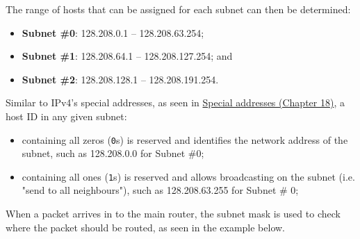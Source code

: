 \documentclass[a4paper]{systems-software}
\begin{document}
The range of hosts that can be assigned for each subnet can then be determined:
\begin{itemize}
	\item \textbf{Subnet \#0}: 128.208.0.1 -- 128.208.63.254;
	\item \textbf{Subnet \#1}: 128.208.64.1 -- 128.208.127.254; and
	\item \textbf{Subnet \#2}: 128.208.128.1 -- 128.208.191.254.
\end{itemize}

Similar to IPv4's special addresses, as seen in \hyperref[sec:special_addresses]{Special addresses (Chapter 18)}, a host ID in any given subnet:
\begin{itemize}
	\item containing all zeros (\texttt{0}s) is reserved and identifies the network address of the subnet, such as 128.208.0.0 for Subnet \#0;
	\item containing all ones (\texttt{1}s) is reserved and allows broadcasting on the subnet (i.e. "send to all neighbours"), such as 128.208.63.255 for Subnet \# 0;
\end{itemize}

When a packet arrives in to the main router, the subnet mask is used to check where the packet should be routed, as seen in the example below.
\end{document}

